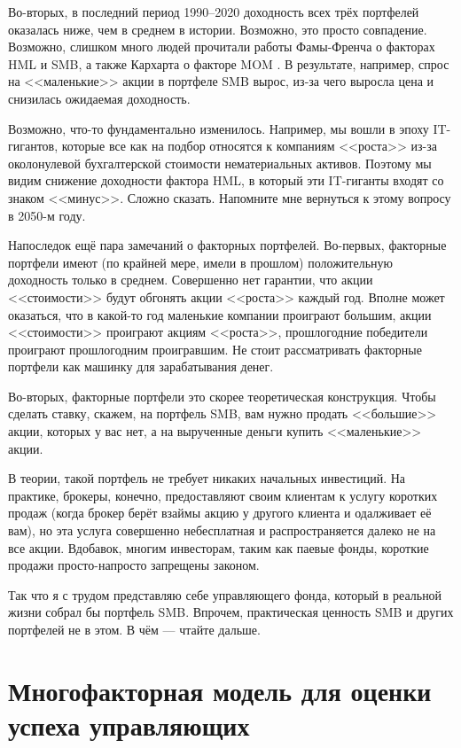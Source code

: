Во-вторых, в последний период 1990--2020 доходность всех трёх портфелей оказалась ниже, чем в среднем в истории. Возможно, это просто совпадение. Возможно, слишком много людей прочитали работы Фамы-Френча о факторах HML и SMB, а также Кархарта о факторе MOM \cite{carhart1997persistence}. В результате, например, спрос на <<маленькие>> акции в портфеле SMB вырос, из-за чего выросла цена и снизилась ожидаемая доходность.

Возможно, что-то фундаментально изменилось. Например, мы вошли в эпоху IT-гигантов, которые все как на подбор относятся к компаниям <<роста>> из-за околонулевой бухгалтерской стоимости нематериальных активов. Поэтому мы видим снижение доходности фактора HML, в который эти IT-гиганты входят со знаком <<минус>>. Сложно сказать. Напомните мне вернуться к этому вопросу в 2050-м году.

Напоследок ещё пара замечаний о факторных портфелей. Во-первых, факторные портфели имеют (по крайней мере, имели в прошлом) положительную доходность только в среднем. Совершенно нет гарантии, что акции <<стоимости>> будут обгонять акции <<роста>> каждый год. Вполне может оказаться, что в какой-то год маленькие компании проиграют большим, акции <<стоимости>> проиграют акциям <<роста>>, прошлогодние победители проиграют прошлогодним проигравшим. Не стоит рассматривать факторные портфели как машинку для зарабатывания денег.

Во-вторых, факторные портфели это скорее теоретическая конструкция. Чтобы сделать ставку, скажем, на портфель SMB, вам нужно продать  <<большие>> акции, которых у вас нет, а на вырученные деньги купить <<маленькие>> акции.

В теории, такой портфель не требует никаких начальных инвестиций. На практике, брокеры, конечно, предоставляют своим клиентам к услугу коротких продаж (когда брокер берёт взаймы акцию у другого клиента и одалживает её вам), но эта услуга совершенно небесплатная и распространяется далеко не на все акции. Вдобавок, многим инвесторам, таким как паевые фонды, короткие продажи просто-напросто запрещены законом.

Так что я с трудом представляю себе управляющего фонда, который в реальной жизни собрал бы портфель SMB. Впрочем, практическая ценность SMB и других портфелей не в этом. В чём --- чтайте дальше.

\section*{Многофакторная модель для оценки успеха управляющих}

